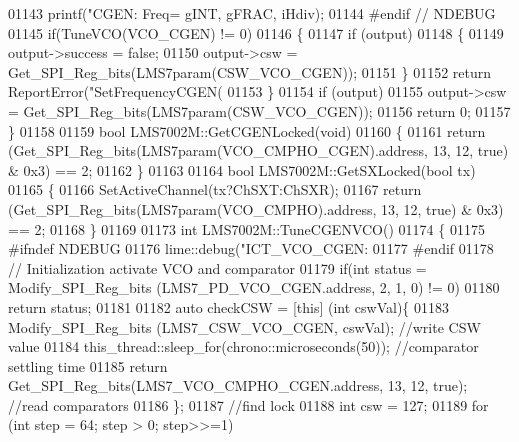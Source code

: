 \begin{DoxyCode}
{{{{{{{{{{{{{{{{{{{{{{{{{{{{01143     printf(\textcolor{stringliteral}{"CGEN: Freq=%
      gINT, gFRAC, iHdiv);
01144 \textcolor{preprocessor}{#endif // NDEBUG}
01145     \textcolor{keywordflow}{if}(TuneVCO(VCO_CGEN) != 0)
01146     \{
01147         \textcolor{keywordflow}{if} (output)
01148         \{
01149             output->success = \textcolor{keyword}{false};
01150             output->csw = Get_SPI_Reg_bits(LMS7param(CSW_VCO_CGEN));
01151         \}
01152         \textcolor{keywordflow}{return} ReportError(\textcolor{stringliteral}{"SetFrequencyCGEN(%
01153     \}
01154     \textcolor{keywordflow}{if} (output)
01155         output->csw = Get_SPI_Reg_bits(LMS7param(CSW_VCO_CGEN));
01156     \textcolor{keywordflow}{return} 0;
01157 \}
01158 
01159 \textcolor{keywordtype}{bool} LMS7002M::GetCGENLocked(\textcolor{keywordtype}{void})
01160 \{
01161     \textcolor{keywordflow}{return} (Get_SPI_Reg_bits(LMS7param(VCO_CMPHO_CGEN).address, 13, 12, \textcolor{keyword}{true}) & 0x3) == 2;
01162 \}
01163 
01164 \textcolor{keywordtype}{bool} LMS7002M::GetSXLocked(\textcolor{keywordtype}{bool} tx)
01165 \{
01166     SetActiveChannel(tx?ChSXT:ChSXR);
01167     \textcolor{keywordflow}{return} (Get_SPI_Reg_bits(LMS7param(VCO_CMPHO).address, 13, 12, \textcolor{keyword}{true}) & 0x3) == 2;
01168 \}
01169 
01173 \textcolor{keywordtype}{int} LMS7002M::TuneCGENVCO()
01174 \{
01175 \textcolor{preprocessor}{#ifndef NDEBUG}
01176     lime::debug(\textcolor{stringliteral}{"ICT\_VCO\_CGEN: %
01177 \textcolor{preprocessor}{#endif}
01178     \textcolor{comment}{// Initialization activate VCO and comparator}
01179     \textcolor{keywordflow}{if}(\textcolor{keywordtype}{int} status = Modify_SPI_Reg_bits (LMS7_PD_VCO_CGEN.address, 2, 1, 0) != 0)
01180         \textcolor{keywordflow}{return} status;
01181 
01182     \textcolor{keyword}{auto} checkCSW = [\textcolor{keyword}{this}] (\textcolor{keywordtype}{int} cswVal)\{
01183             Modify_SPI_Reg_bits (LMS7_CSW_VCO_CGEN, cswVal);    \textcolor{comment}{//write CSW value}
01184             this\_thread::sleep\_for(chrono::microseconds(50)); \textcolor{comment}{//comparator settling time}
01185             \textcolor{keywordflow}{return} Get_SPI_Reg_bits(LMS7_VCO_CMPHO_CGEN.address, 13, 12, \textcolor{keyword}{true}); \textcolor{comment}{//read comparators}
01186         \};
01187     \textcolor{comment}{//find lock}
01188     \textcolor{keywordtype}{int} csw = 127;
01189     \textcolor{keywordflow}{for} (\textcolor{keywordtype}{int} step = 64; step > 0; step>>=1)
}}}}}}}}}}}}}}}}}}}}}}}}}}}}}}}
\end{DoxyCode}
